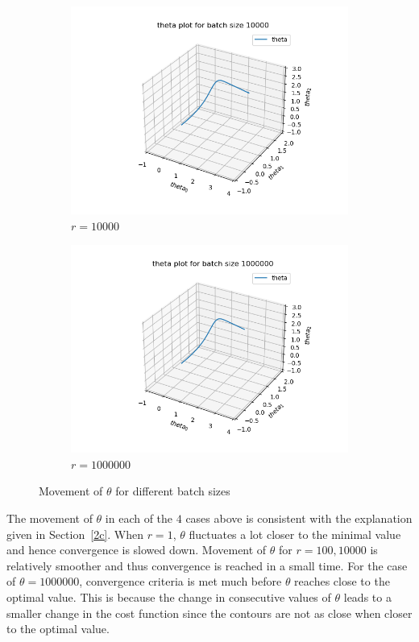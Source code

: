 \documentclass[11pt]{article}
\begin{document}
\begin{figure}[H]
    \medskip
    \begin{subfigure}[t]{0.45\textwidth}
        \centering
        \includegraphics[width=\linewidth]{Q2/output/d10000.png}
        \caption{$r=10000$}
    \end{subfigure}
    \hfill
    \begin{subfigure}[t]{0.45\textwidth}
        \centering
        \includegraphics[width=\linewidth]{Q2/output/d1000000.png}
        \caption{$r=1000000$}
    \end{subfigure} 
    \caption{Movement of $\theta$ for different batch sizes}
\end{figure}

The movement of $\theta$ in each of the $4$ cases above is consistent with the explanation given in Section~\ref{2c}. When $r=1$, $\theta$ fluctuates a lot closer to the minimal value and hence convergence is slowed down. Movement of $\theta$ for $r=100, 10000$ is relatively smoother and thus convergence is reached in a small time. For the case of $\theta=1000000$, convergence criteria is met much before $\theta$ reaches close to the optimal value. This is because the change in
consecutive values of $\theta$ leads to a smaller change in the cost function since the contours are not as close when closer to the optimal value.
\end{document}
